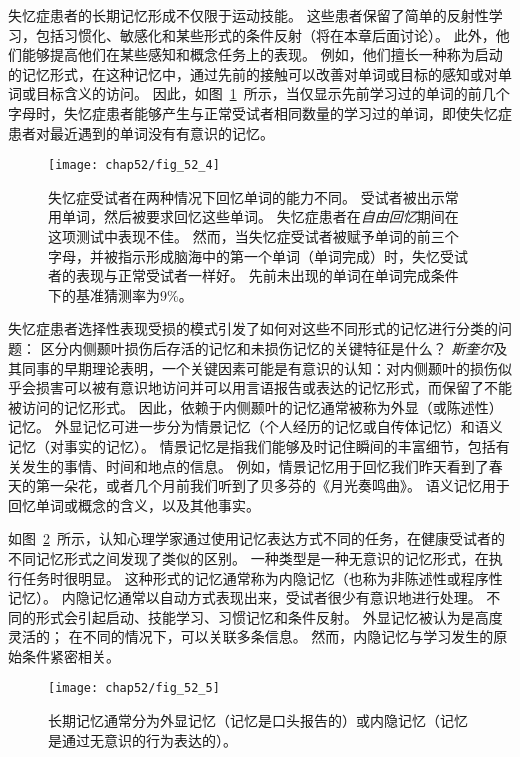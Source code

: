 失忆症患者的长期记忆形成不仅限于运动技能。
这些患者保留了简单的反射性学习，包括习惯化、敏感化和某些形式的条件反射（将在本章后面讨论）。
此外，他们能够提高他们在某些感知和概念任务上的表现。
例如，他们擅长一种称为启动的记忆形式，在这种记忆中，通过先前的接触可以改善对单词或目标的感知或对单词或目标含义的访问。
因此，如图~\ref{fig:52_4}~所示，当仅显示先前学习过的单词的前几个字母时，失忆症患者能够产生与正常受试者相同数量的学习过的单词，即使失忆症患者对最近遇到的单词没有有意识的记忆。


\begin{figure}[htbp]
	\centering
	\texttt{[image: chap52/fig\_52\_4]}
	\caption{失忆症受试者在两种情况下回忆单词的能力不同。
		受试者被出示常用单词，然后被要求回忆这些单词。
		失忆症患者在\textit{自由回忆}期间在这项测试中表现不佳。
		然而，当失忆症受试者被赋予单词的前三个字母，并被指示形成脑海中的第一个单词（单词完成）时，失忆受试者的表现与正常受试者一样好。
		先前未出现的单词在单词完成条件下的基准猜测率为9\%\cite{squire1987memory}。}
	\label{fig:52_4}
\end{figure}


失忆症患者选择性表现受损的模式引发了如何对这些不同形式的记忆进行分类的问题：
区分内侧颞叶损伤后存活的记忆和未损伤记忆的关键特征是什么？
\textit{斯奎尔}及其同事的早期理论表明，一个关键因素可能是有意识的认知：对内侧颞叶的损伤似乎会损害可以被有意识地访问并可以用言语报告或表达的记忆形式，而保留了不能被访问的记忆形式。
因此，依赖于内侧颞叶的记忆通常被称为外显（或陈述性）记忆。
外显记忆可进一步分为情景记忆（个人经历的记忆或自传体记忆）和语义记忆（对事实的记忆）。
情景记忆是指我们能够及时记住瞬间的丰富细节，包括有关发生的事情、时间和地点的信息。
例如，情景记忆用于回忆我们昨天看到了春天的第一朵花，或者几个月前我们听到了贝多芬的《月光奏鸣曲》。
语义记忆用于回忆单词或概念的含义，以及其他事实。


如图~\ref{fig:52_5}~所示，认知心理学家通过使用记忆表达方式不同的任务，在健康受试者的不同记忆形式之间发现了类似的区别。
一种类型是一种无意识的记忆形式，在执行任务时很明显。
这种形式的记忆通常称为内隐记忆（也称为非陈述性或程序性记忆）。
内隐记忆通常以自动方式表现出来，受试者很少有意识地进行处理。
不同的形式会引起启动、技能学习、习惯记忆和条件反射。
外显记忆被认为是高度灵活的；
在不同的情况下，可以关联多条信息。
然而，内隐记忆与学习发生的原始条件紧密相关。


\begin{figure}[htbp]
	\centering
	\texttt{[image: chap52/fig\_52\_5]}
	\caption{长期记忆通常分为外显记忆（记忆是口头报告的）或内隐记忆（记忆是通过无意识的行为表达的）。}
	\label{fig:52_5}
\end{figure}


